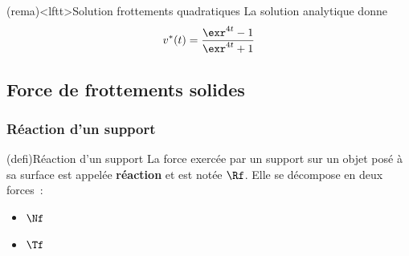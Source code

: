 \documentclass[../../main/main.tex]{subfiles}
\begin{document}
\begin{tcb}(rema)<lftt>{Solution frottements quadratiques}
	La solution analytique donne
	\[
		v^*(t) = \frac{\exr^{4t}-1}{\exr^{4t}+1}
	\]
\end{tcb}

\subsection{Force de frottements solides}
\subsubsection{Réaction d'un support}

\begin{tcb*}[sidebyside, righthand ratio=.4](defi){Réaction d'un support}
	La force exercée par un support sur un objet posé à sa surface est appelée
	\textbf{réaction} et est notée $\Rf$. Elle se décompose en deux forces~:
	\psw{%
		\[
			\Rf = \Nf + \Tf
			\qou
			\Rf = \Rf_N + \Rf_T
		\]
	}%
	\vspace{-25pt}
	\begin{itemize}
		\item $\Nf$ 
		\item $\Tf$ %
	\end{itemize}
	\tcblower
	\begin{center}
		\vspace{-25pt}
	\end{center}
\end{tcb*}
\end{document}
